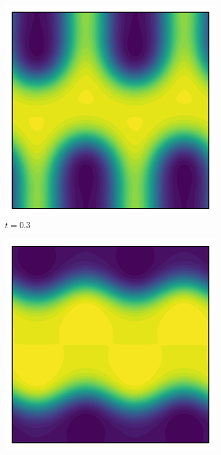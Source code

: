 \documentclass{article} %
\begin{document}
\begin{figure}[!h]
    \begin{subfigure}[b]{0.2\textwidth}
        \includegraphics[width=\textwidth]{phi_0.3.pdf}
        \caption*{$t = 0.3$}
        \label{fig:image5}
    \end{subfigure}
    \hfill
    \begin{subfigure}[b]{0.2\textwidth}
        \includegraphics[width=\textwidth]{phi_0.4.pdf}

\end{subfigure}
\end{figure}
\end{document}
